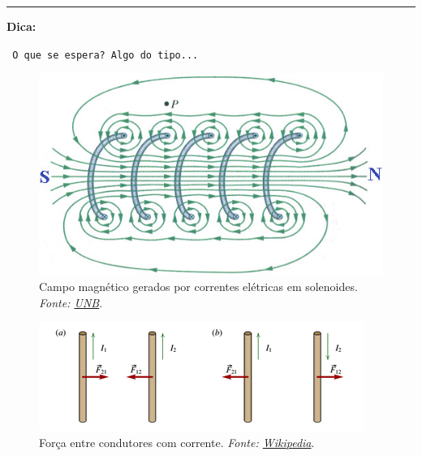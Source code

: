 \noindent
{\color{red} \rule{\linewidth}{0.5mm} }
\textbf{Dica:}

\noindent \texttt{ O que se espera? Algo do tipo...}

\begin{figure}[H]
	\centering
	\includegraphics[scale=.5]{img/solenoide1.jpg}
	\caption{Campo magnético gerados por correntes elétricas em solenoides. \textit{Fonte: \href{http://ensinoadistancia.pro.br/EaD/Eletromagnetismo/LeiAmpereExe/LeiAmpereExe.html}{UNB}}.}
	\label{fig:fig-campo-solenoide}
\end{figure}

\begin{figure}[H]
	\centering
	\includegraphics[scale=.7]{img/forcas-magneticas_entre_dois_fios_com_corrente.png}
	\caption{Força entre condutores com corrente. \textit{Fonte: \href{https://pt.wikipedia.org/wiki/For\%C3\%A7a_magn\%C3\%A9tica}{Wikipedia}}.}
	\label{fig:fig-forca-condutores-paralelos}
\end{figure}
